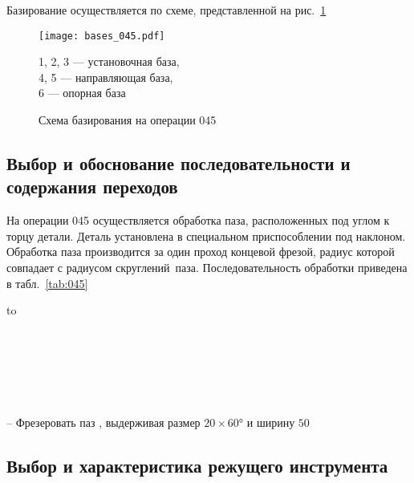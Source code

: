 \documentclass[14pt,russian,a4paper]{extreport}
\newcommand*\circled[1]{\tikz[baseline=(char.base)]{
             \node[shape=circle,draw,inner sep=2pt, minimum size=8mm] (char) {#1};}}
\begin{document}
Базирование осуществляется по схеме, представленной на рис.~\ref{fig:b045}

\begin{figure}[H]
	\centering
	   \texttt{[image: bases\_045.pdf]}
	   \caption{Схема базирования на операции 045}
	   \label{fig:b045}
	   1, 2, 3 --- установочная база, \\
	   4, 5 --- направляющая база, \\
	   6 --- опорная база
\end{figure}

\subsection{Выбор и обоснование последовательности и содержания переходов}

На операции 045 осуществляется обработка паза, расположенных под углом к торцу детали. Деталь установлена в специальном приспособлении под наклоном. Обработка паза производится за один проход концевой фрезой, радиус которой совпадает с радиусом скруглений паза. Последовательность обработки приведена в табл.~\ref{tab:045}

\begin{table}[H]
  \setlength{\tabulinesep}{1.2ex}
  \begin{longtabu} to \textwidth { | X[7,l,p] | }
    \caption{Содержание основных переходов операции 045} \label{tab:045} \\
  
      \hline 
       \\ \hline 
    \endfirsthead
  
       \\ \hline 
       \\ \hline
    \endhead
  
      \hline
    \endfoot

      -- Фрезеровать паз \circled{34}, выдерживая размер $20 \times \ang{60}$ и ширину $50$ \\ \hline

  \end{longtabu}
\end{table}

\subsection{Выбор и характеристика режущего инструмента}
\end{document}
